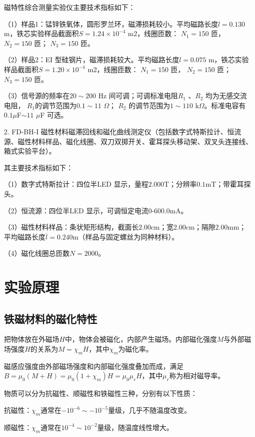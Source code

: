 \documentclass[11pt]{article}
\begin{document}
磁特性综合测量实验仪主要技术指标如下：

（1）样品1：锰锌铁氧体，圆形罗兰环，磁滞损耗较小。平均磁路长度$l =0.130$m，铁芯实验样品截面积$S =1.24\times 10^{-4}$ m2，线圈匝数： $N_1 =150$ 匝， $N_2 =150$ 匝； $N_3 =150$ 匝。

（2）样品2：EI 型硅钢片，磁滞损耗较大。平均磁路长度$l =0.075$ m，铁芯实验样品截面积$S =1.20\times 10^{-4}$ m2，线圈匝数： $N_1 =150$ 匝， $N_2 =150$ 匝； $N_3 =150$ 匝。

（3）信号源的频率在$20\sim 200$ Hz 间可调；可调标准电阻$R_1$ 、$R_2$ 均为无感交流电阻， $R_1$的调节范围为$0.1\sim 11$ $\Omega $； $R_2$ 的调节范围为$1\sim 110$ k$\Omega $。标准电容有$0.1 $$\mu $F$\sim 11$ $\mu $F 可选。

2. FD-BH-I 磁性材料磁滞回线和磁化曲线测定仪（包括数字式特斯拉计、恒流源、磁性材料样品、磁化线圈、双刀双掷开关、霍耳探头移动架、双叉头连接线、箱式实验平台）。

其主要技术指标如下：

（1）数字式特斯拉计：四位半LED 显示，量程$2.000$T；分辨率$0.1$mT；带霍耳探头。

（2）恒流源：四位半LED 显示，可调恒定电流$0$-$600.0$mA。

（3）磁性材料样品：条状矩形结构，截面长$2.00$cm；宽$2.00$cm；隔隙$2.00$mm；平均磁路长度$\overline{l} =0.240$m（样品与固定螺丝为同种材料）。

（4）磁化线圈总匝数$N=2000$。

\section{实验原理}

\subsection{铁磁材料的磁化特性}

把物体放在外磁场$H$中，物体会被磁化，内部产生磁场。内部磁化强度$M$与外部磁场强度$H$的关系为$M = \chi_mH$，其中$\chi_m$为磁化率。

磁感应强度由外部磁场强度和内部磁化强度叠加而成，满足$B = \mu_0(M + H) = \mu_0(1 + \chi_m)H = \mu_0\mu_rH$，其中$\mu_r$称为相对磁导率。

物质可以分为抗磁性、顺磁性和铁磁性三种，分别有以下性质：

抗磁性：$\chi_m$通常在$-10^{-6}\sim - 10^{-5}$量级，几乎不随温度改变。

顺磁性：$\chi_m$通常在$10^{-4}\sim 10^{-2}$量级，随温度线性增大。
\end{document}
